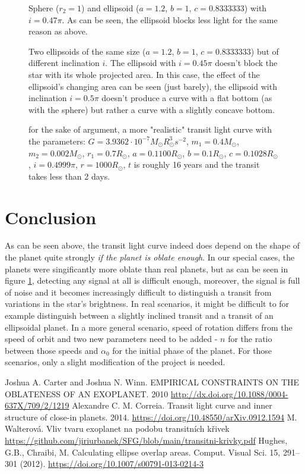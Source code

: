 \documentclass[10pt]{article}
\numberwithin{equation}{subsection}
\begin{document}
\begin{figure}[H]
  \centering
  
  \caption{Sphere ($r_2=1$) and ellipsoid ($a=1.2$, $b=1$, $c=0.8333333$) with $i=0.47\pi$.
  As can be seen, the ellipsoid blocks less light for the same reason as above.}
\end{figure}
\begin{figure}[H]
  \centering
  
  \caption{Two ellipsoids of the same size ($a=1.2$, $b=1$, $c=0.8333333$) but of different
  inclination $i$. The ellipsoid with $i=0.45\pi$ doesn't block the star with its whole
  projected area. In this case, the effect of the ellipsoid's changing area can be seen
  (just barely), the ellipsoid with inclination $i=0.5\pi$ doesn't produce a curve
  with a flat bottom (as with the sphere) but rather a curve with a slightly concave
  bottom.}
\end{figure}
\begin{figure}[H]
  \centering
  
  \caption{for the sake of argument, a more "realistic" transit light curve with the parameters:
  $G = 3.9362\cdot 10^{-7}M_\odot R^3_\odot s^{-2}$, $m_1 = 0.4M_\odot$, $m_2 = 0.002M_\odot$, $r_1 = 0.7R_\odot$, $a = 0.1100R_\odot$, $b = 0.1R_\odot$, $c = 0.1028R_\odot$, $i = 0.4999\pi$, $r = 1000R_\odot$,
  $t$ is roughly 16 years and the transit takes less than 2 days.}
  \label{fig:6}
\end{figure}
\section{Conclusion}
As can be seen above, the transit light curve indeed does depend on the shape of the planet
quite strongly \emph{if the planet is oblate enough}. In our special cases, the planets
were singificantly more oblate than real planets, but as can be seen in figure \ref{fig:6},
detecting any signal at all is difficult enough, moreover, the signal is full of noise
and it becomes increasingly difficult to distinguish a transit from variations in the star's
brightness. In real scenarios, it might be difficult to for example distinguish between
a slightly inclined transit and a transit of an ellipsoidal planet. In a more general
scenario, speed of rotation differs from the speed of orbit and two new parameters
need to be added - $n$ for the ratio between those speeds and $\alpha_0$ for the
initial phase of the planet. For those scenarios,
only a slight modification of the project is needed.
\begin{thebibliography}{5}
   Joshua A. Carter and Joshua N. Winn. EMPIRICAL CONSTRAINTS ON THE OBLATENESS OF AN EXOPLANET. 2010 \url{http://dx.doi.org/10.1088/0004-637X/709/2/1219}
   Alexandre C. M. Correia. Transit light curve and inner structure of close-in planets. 2014. \url{https://doi.org/10.48550/arXiv.0912.1594}
   M. Walterová. Vliv tvaru exoplanet na podobu transitních křivek \url{https://github.com/jiriurbanek/SFG/blob/main/transitni-krivky.pdf}
   Hughes, G.B., Chraibi, M. Calculating ellipse overlap areas. Comput. Visual Sci. 15, 291–301 (2012). \url{https://doi.org/10.1007/s00791-013-0214-3}
\end{thebibliography}
\end{document}
